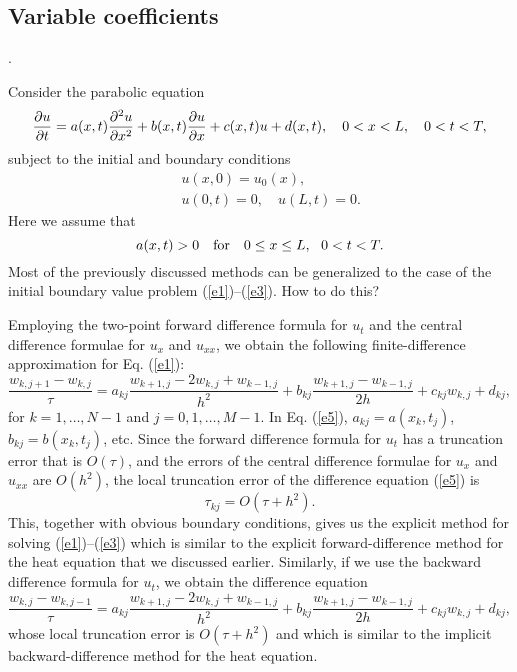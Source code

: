 \subsection{Variable coefficients}.

Consider the parabolic equation
\begin{equation}
\frac{{\partial} u}{{\partial} t} =a(x,t)\frac{{\partial}^{2} u}{{\partial} x^{2}}+
b(x,t)\frac{{\partial} u}{{\partial} x}+c(x,t)u+d(x,t),  \quad 0<x< L, \quad 0<t<T, \label{e1}
\end{equation}
subject to the initial and boundary conditions
\begin{eqnarray}
&&u(x, 0) = u_{0}(x), \label{e2} \\
&&u(0,t)=0, \quad u(L,t)=0.   \label{e3}
\end{eqnarray}
Here we assume that
\begin{equation}
a(x,t)> 0 \quad {\rm for} \quad 0\leq x\leq L, \ \ 0<t<T. \label{e4}
\end{equation}
Most of the previously discussed methods can be generalized to the case of
the initial boundary value problem (\ref{e1})--(\ref{e3}).  How to do this?
 
Employing the two-point forward difference formula for $u_t$ and
the central difference formulae for $u_x$ and $u_{xx}$, we obtain
the following finite-difference approximation for Eq. (\ref{e1}):
\begin{equation}
\frac{w_{k,j+1}-w_{k,j}}{\tau} =a_{kj}\frac{w_{k+1,j}-2w_{k,j}+w_{k-1,j}}{h^{2}}+
b_{kj}\frac{w_{k+1,j}-w_{k-1,j}}{2h}+c_{kj}w_{k,j}+d_{kj},   \label{e5}
\end{equation}
for $k=1, \dots,N-1$ and $j=0, 1,\dots,M-1$. In Eq. (\ref{e5}),
$a_{kj}=a(x_{k},t_{j})$, $b_{kj}=b(x_{k},t_{j})$, etc. Since
the forward difference formula
for $u_t$ has a truncation error that is $O(\tau)$, and
the errors of the central difference formulae for $u_x$ and $u_{xx}$
are $O(h^2)$, the local truncation error of the difference equation (\ref{e5}) is
\[
\tau_{kj}=O(\tau+h^2).
\]
This, together with obvious boundary conditions, gives us the explicit method
for solving (\ref{e1})--(\ref{e3}) which is similar to the explicit
forward-difference method for the heat equation that we discussed earlier.
Similarly, if we use the backward difference formula for $u_t$, we obtain
the difference equation
\begin{equation}
\frac{w_{k,j}-w_{k,j-1}}{\tau} =a_{kj}\frac{w_{k+1,j}-2w_{k,j}+w_{k-1,j}}{h^{2}}+
b_{kj}\frac{w_{k+1,j}-w_{k-1,j}}{2h}+c_{kj}w_{k,j}+d_{kj},   \label{e6}
\end{equation}
whose local truncation error is $O(\tau+h^2)$ and which is similar to the implicit
backward-difference method for the heat equation.
 
